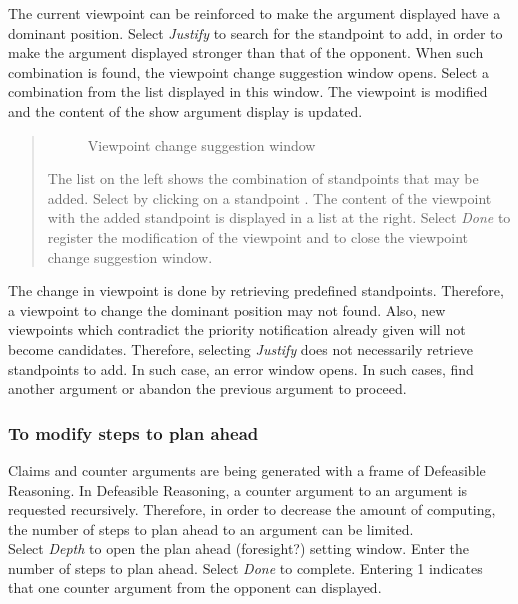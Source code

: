 The current viewpoint can be reinforced to make the argument displayed have a dominant position.
Select {\sl Justify} to search for the standpoint to add, in order to make the argument displayed stronger than that of the opponent.
When such combination is found, the viewpoint change suggestion window opens.
Select a combination from the list displayed in this window.
The viewpoint is modified and the content of the show argument display is updated.

\begin{quote}
\begin{figure}[htb]
\begin{center}
\end{center}
\caption{Viewpoint change suggestion window}\label{Viewpoint change suggestion window}
\end{figure}

The list on the left shows the combination of standpoints that may be added.  Select by clicking on a standpoint .
The content of the viewpoint with the added standpoint is displayed in a list at the right.
Select {\sl Done} to register the modification of the viewpoint and to close the viewpoint change suggestion window.
\end{quote}

The change in viewpoint is done by retrieving predefined standpoints.  Therefore, a viewpoint to change the dominant position may not found.
Also, new viewpoints which contradict the priority notification already given will not become candidates.
Therefore, selecting {\sl Justify} does not necessarily retrieve standpoints to add.  In such case, an error window opens.
In such cases, find another argument or abandon the previous argument to proceed.

\subsubsection{To modify steps to plan ahead}

Claims and counter arguments are being generated with a frame of Defeasible Reasoning.  In Defeasible Reasoning, a counter argument to an argument is requested recursively.  Therefore, in order to decrease the amount of computing, the number of steps to plan ahead to an argument can be limited.\\
Select {\sl Depth} to open the plan ahead (foresight?) setting window.
Enter the number of steps to plan ahead.
Select {\sl Done} to complete.
Entering 1 indicates that one counter argument from the opponent can displayed.

